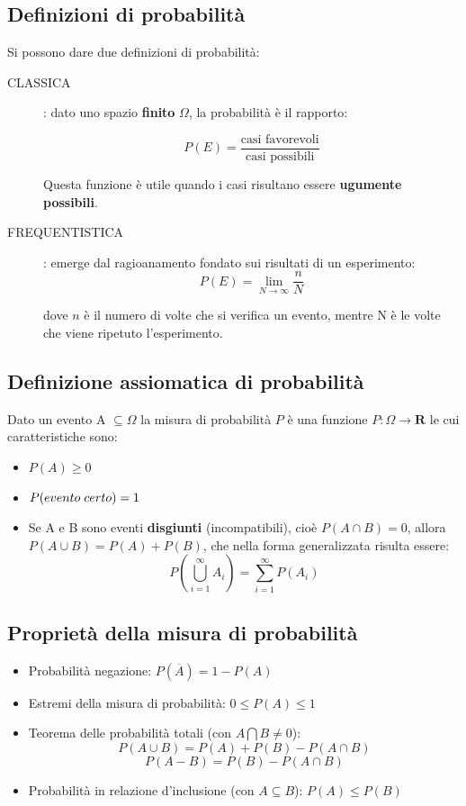 \documentclass{article}
\theoremstyle{remark}
\begin{document}
\subsection{Definizioni di probabilità}
Si possono dare due definizioni di probabilità:
\begin{description}

\item[CLASSICA]: dato uno spazio \textbf{finito} $\Omega$, la probabilità è il rapporto:

\[
P(E)= \frac{\text{casi favorevoli}}{\text{casi possibili}}
\]

Questa funzione è utile quando i casi risultano essere \textbf{ugumente possibili}.

\vspace{0.5cm}

\item[FREQUENTISTICA]: emerge dal ragioanamento fondato sui risultati di un esperimento:
\[
P(E)=\lim_{N \rightarrow \infty} \frac{n}{N}
\]

dove $n$ è il numero di volte che si verifica un evento, mentre N è le volte che viene ripetuto l'esperimento.
\end{description}


\subsection{Definizione assiomatica di probabilità}
Dato un evento A $\subseteq \Omega$ la misura di probabilità $P$ è una funzione $P:\Omega \rightarrow \mathbf{R}  $ le cui caratteristiche sono:



\begin{itemize}
    \item $P(A) \geq 0$
    \item $P (evento \hspace{0.1cm} certo)=1$
    \item  Se A e B sono eventi \textbf{disgiunti} (incompatibili), cioè $P(A \cap B) = 0$, allora $P(A \cup B) = P(A)+P(B)$, che nella forma generalizzata risulta essere:
    \[
    P(\bigcup_{i=1}^{\infty}A_i)=\sum_{i=1}^{\infty}P(A_i)
    \]
\end{itemize}

\subsection{Proprietà della misura di probabilità}
\begin{itemize}

    \item Probabilità negazione: $P(\overline{A})=1-P(A)$
    \item Estremi della misura di probabilità: $0 \leq P(A)\leq 1$
    \item Teorema delle probabilità totali (con $A \bigcap B \neq 0$): 
    \[
    P(A \cup B)=P(A)+P(B)-P(A \cap B)
    \]
    \[
    P(A - B)=P(B)-P(A \cap B)
    \]
    \item Probabilità in relazione d'inclusione (con $A\subseteq B$): $P(A)\leq P(B)$
\end{itemize}
\end{document}
